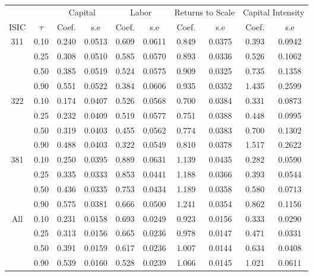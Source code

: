 \begin{table}[H]
\centering
\begin{tabular}{cccccccccc}
  \hline\hline & & \multicolumn{2}{c}{Capital}  & \multicolumn{2}{c}{Labor} & \multicolumn{2}{c}{Returns to Scale} & \multicolumn{2}{c}{Capital Intensity}\\ \cmidrule(lr){3-4} \cmidrule(lr){5-6} \cmidrule(lr){7-8} \cmidrule(lr){9-10}ISIC & $\tau$ & Coef. & s.e & Coef. & s.e & Coef. & s.e & Coef. & s.e \\ 
  \hline
311 & 0.10 & 0.240 & 0.0513 & 0.609 & 0.0611 & 0.849 & 0.0375 & 0.393 & 0.0942 \\ 
   & 0.25 & 0.308 & 0.0510 & 0.585 & 0.0570 & 0.893 & 0.0336 & 0.526 & 0.1062 \\ 
   & 0.50 & 0.385 & 0.0519 & 0.524 & 0.0575 & 0.909 & 0.0325 & 0.735 & 0.1358 \\ 
   & 0.90 & 0.551 & 0.0522 & 0.384 & 0.0606 & 0.935 & 0.0352 & 1.435 & 0.2599 \\ 
  322 & 0.10 & 0.174 & 0.0407 & 0.526 & 0.0568 & 0.700 & 0.0384 & 0.331 & 0.0873 \\ 
   & 0.25 & 0.232 & 0.0409 & 0.519 & 0.0577 & 0.751 & 0.0388 & 0.448 & 0.0995 \\ 
   & 0.50 & 0.319 & 0.0403 & 0.455 & 0.0562 & 0.774 & 0.0383 & 0.700 & 0.1302 \\ 
   & 0.90 & 0.488 & 0.0403 & 0.322 & 0.0549 & 0.810 & 0.0378 & 1.517 & 0.2622 \\ 
  381 & 0.10 & 0.250 & 0.0395 & 0.889 & 0.0631 & 1.139 & 0.0435 & 0.282 & 0.0590 \\ 
   & 0.25 & 0.335 & 0.0333 & 0.853 & 0.0441 & 1.188 & 0.0366 & 0.393 & 0.0544 \\ 
   & 0.50 & 0.436 & 0.0335 & 0.753 & 0.0434 & 1.189 & 0.0358 & 0.580 & 0.0713 \\ 
   & 0.90 & 0.575 & 0.0381 & 0.666 & 0.0500 & 1.241 & 0.0354 & 0.862 & 0.1156 \\ 
  All & 0.10 & 0.231 & 0.0158 & 0.693 & 0.0249 & 0.923 & 0.0156 & 0.333 & 0.0290 \\ 
   & 0.25 & 0.313 & 0.0156 & 0.665 & 0.0236 & 0.978 & 0.0147 & 0.471 & 0.0331 \\ 
   & 0.50 & 0.391 & 0.0159 & 0.617 & 0.0236 & 1.007 & 0.0144 & 0.634 & 0.0408 \\ 
   & 0.90 & 0.539 & 0.0160 & 0.528 & 0.0239 & 1.066 & 0.0145 & 1.021 & 0.0611 \\ 
   \hline
\end{tabular}
\end{table}
